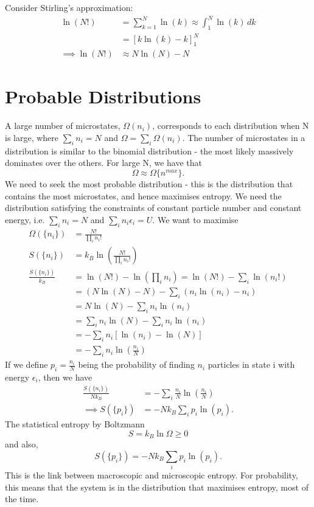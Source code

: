 \documentclass[a4paper, 11pt, normalem]{report}
\newcommand\e{\epsilon}
\begin{document}
Consider Stirling's approximation:
\begin{align}
    \ln(N!) &= \sum_{k=1}^N \ln(k) \approx \int_1^N \ln(k)\,dk \\
            &= [k\ln(k) - k]_1^N \\
    \implies \ln(N!) &\approx N\ln(N) - N
\end{align}

\section{Probable Distributions}
A large number of microstates, $\Omega(n_i)$, corresponds to each distribution when N is large, where $\sum_i n_i = N$ and $\Omega = \sum_i \Omega(n_i)$.
The number of microstates in a distribution is similar to the binomial distribution - the most likely massively dominates over the others.
For large N, we have that
\begin{equation}
    \Omega \approx \Omega\{n^{max}\}.
\end{equation}
We need to seek the most probable distribution - this is the distribution that contains the most microstates, and hence maximises entropy. 
We need the distribution satisfying the constraints of constant particle number and constant energy, i.e. $\sum_i n_i = N$ and $\sum_i n_i\e_i = U$.
We want to maximise 
\begin{align}
    \Omega(\{n_i\}) &= \frac{N!}{\prod_i n_i!} \\
    S(\{n_i\}) &= k_B\ln\left(\frac{N!}{\prod_i n_i!}\right) \\
    \frac{S(\{n_i\})}{k_B} &= \ln(N!) - \ln\left(\prod_i n_i\right) = \ln(N!) - \sum_i \ln(n_i!) \\
                           &= (N\ln(N) - N) - \sum_i (n_i\ln(n_i) - n_i) \\
                           &= N\ln(N) - \sum_i n_i\ln(n_i) \\
                           &= \sum_i n_i\ln(N) - \sum_i n_i\ln(n_i) \\
                           &= -\sum_i n_i\left[\ln(n_i) - \ln(N)\right] \\
                           &= -\sum_i n_i\ln\left(\frac{n_i}{N}\right)
\end{align}
If we define $p_i = \frac{n_i}{N}$ being the probability of finding $n_i$ particles in state i with energy $\e_i$, then we have
\begin{align}
    \frac{S(\{n_i\})}{Nk_B} &= -\sum_i \frac{n_i}{N}\ln\left(\frac{n_i}{N}\right) \\
    \implies S(\{p_i\}) &= -Nk_B\sum_i p_i\ln(p_i).
\end{align}
The statistical entropy by Boltzmann 
\begin{equation}
    S = k_B\ln\Omega \geq 0
\end{equation}
and also, 
\begin{equation}
    S(\{p_i\}) = -Nk_B\sum_i p_i\ln(p_i).
\end{equation}
This is the link between macroscopic and microscopic entropy.
For probability, this means that the system is in the distribution that maximises entropy, most of the time. 
\end{document}
